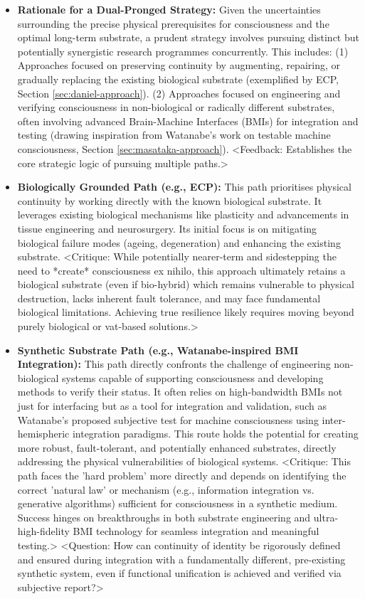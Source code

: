 \documentclass[10pt]{article}
\begin{document}
\begin{sloppypar}
  \begin{itemize}
    \item \textbf{Rationale for a Dual-Pronged Strategy:} Given the uncertainties surrounding the precise physical prerequisites for consciousness and the optimal long-term substrate, a prudent strategy involves pursuing distinct but potentially synergistic research programmes concurrently. This includes: (1) Approaches focused on preserving continuity by augmenting, repairing, or gradually replacing the existing biological substrate (exemplified by ECP, Section \ref{sec:daniel-approach}). (2) Approaches focused on engineering and verifying consciousness in non-biological or radically different substrates, often involving advanced Brain-Machine Interfaces (BMIs) for integration and testing (drawing inspiration from Watanabe's work on testable machine consciousness, Section \ref{sec:masataka-approach}). <Feedback: Establishes the core strategic logic of pursuing multiple paths.>

    \item \textbf{Biologically Grounded Path (e.g., ECP):} This path prioritises physical continuity by working directly with the known biological substrate. It leverages existing biological mechanisms like plasticity and advancements in tissue engineering and neurosurgery. Its initial focus is on mitigating biological failure modes (ageing, degeneration) and enhancing the existing substrate. <Critique: While potentially nearer-term and sidestepping the need to *create* consciousness ex nihilo, this approach ultimately retains a biological substrate (even if bio-hybrid) which remains vulnerable to physical destruction, lacks inherent fault tolerance, and may face fundamental biological limitations. Achieving true resilience likely requires moving beyond purely biological or vat-based solutions.>

    \item \textbf{Synthetic Substrate Path (e.g., Watanabe-inspired BMI Integration):} This path directly confronts the challenge of engineering non-biological systems capable of supporting consciousness and developing methods to verify their status. It often relies on high-bandwidth BMIs not just for interfacing but as a tool for integration and validation, such as Watanabe's proposed subjective test for machine consciousness using inter-hemispheric integration paradigms. This route holds the potential for creating more robust, fault-tolerant, and potentially enhanced substrates, directly addressing the physical vulnerabilities of biological systems. <Critique: This path faces the 'hard problem' more directly and depends on identifying the correct 'natural law' or mechanism (e.g., information integration vs. generative algorithms) sufficient for consciousness in a synthetic medium. Success hinges on breakthroughs in both substrate engineering and ultra-high-fidelity BMI technology for seamless integration and meaningful testing.> <Question: How can continuity of identity be rigorously defined and ensured during integration with a fundamentally different, pre-existing synthetic system, even if functional unification is achieved and verified via subjective report?>


\end{itemize}
\end{sloppypar}
\end{document}
